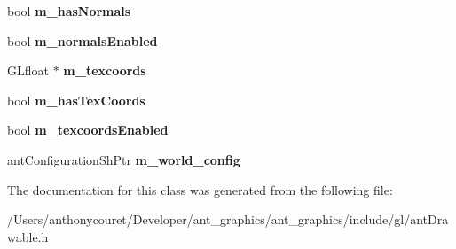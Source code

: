 \begin{DoxyCompactItemize}
\item 
\hypertarget{classant_drawable_a34f05f633360395ad6f9d8c524b92737}{bool {\bfseries m\+\_\+has\+Normals}}\label{classant_drawable_a34f05f633360395ad6f9d8c524b92737}

\item 
\hypertarget{classant_drawable_a77369a2341dcf92011260f57f5d86aec}{bool {\bfseries m\+\_\+normals\+Enabled}}\label{classant_drawable_a77369a2341dcf92011260f57f5d86aec}

\item 
\hypertarget{classant_drawable_af1cb237b3861412af1e8ec5519b36d73}{G\+Lfloat $\ast$ {\bfseries m\+\_\+texcoords}}\label{classant_drawable_af1cb237b3861412af1e8ec5519b36d73}

\item 
\hypertarget{classant_drawable_ab8dfeca134b6d453375cc86f17962d39}{bool {\bfseries m\+\_\+has\+Tex\+Coords}}\label{classant_drawable_ab8dfeca134b6d453375cc86f17962d39}

\item 
\hypertarget{classant_drawable_a7fa69da9f4ceb1134858b561521b16fd}{bool {\bfseries m\+\_\+texcoords\+Enabled}}\label{classant_drawable_a7fa69da9f4ceb1134858b561521b16fd}

\item 
\hypertarget{classant_drawable_abb81baba7f4269a61e0cb7fc000cd7c6}{ant\+Configuration\+Sh\+Ptr {\bfseries m\+\_\+world\+\_\+config}}\label{classant_drawable_abb81baba7f4269a61e0cb7fc000cd7c6}

\end{DoxyCompactItemize}


The documentation for this class was generated from the following file\+:\begin{DoxyCompactItemize}
\item 
/\+Users/anthonycouret/\+Developer/ant\+\_\+graphics/ant\+\_\+graphics/include/gl/ant\+Drawable.\+h\end{DoxyCompactItemize}
